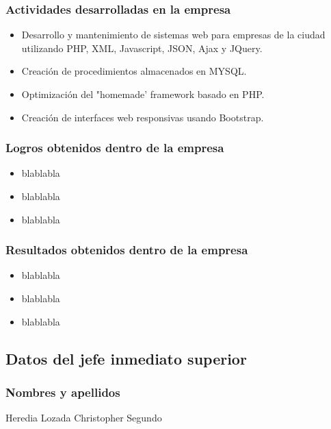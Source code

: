 \subsubsection{Actividades desarrolladas en la empresa} 
\begin{itemize} 
	
\item Desarrollo y mantenimiento de sistemas web para empresas de la ciudad utilizando PHP, XML, Javascript, JSON, Ajax y JQuery.
\item Creación de procedimientos almacenados en MYSQL.
\item Optimización del "homemade' framework basado en PHP.
\item Creación de interfaces web responsivas usando Bootstrap.
\end{itemize} 


\subsubsection{Logros obtenidos dentro de la empresa} 

\begin{itemize} 
\item blablabla
\item blablabla
\item blablabla	
\end{itemize} 

\subsubsection{Resultados obtenidos dentro de la empresa} 

\begin{itemize} 
	\item blablabla
	\item blablabla
	\item blablabla	
\end{itemize} 

\subsection{Datos del jefe inmediato superior}

\subsubsection{Nombres y apellidos}
Heredia Lozada Christopher Segundo 


